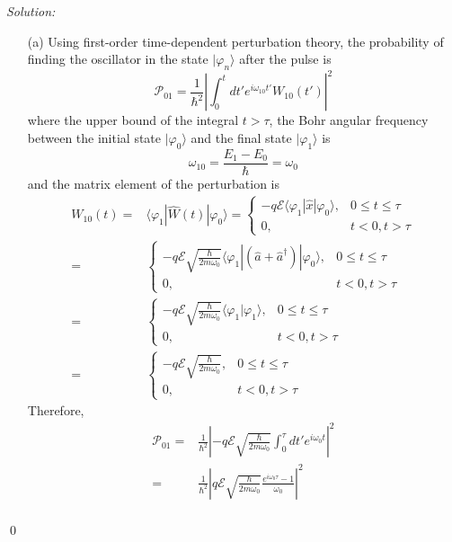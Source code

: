 \documentclass[10pt,a4paper]{article}
\newenvironment{sol}
    {\emph{Solution:}
    }
    {
    \qed
    }
\begin{document}
\begin{sol}
\begin{itemize}
\item[(a)] Using first-order time-dependent perturbation theory, the probability of finding the oscillator in the state $|\varphi_n\rangle$ after the pulse is
\begin{equation}
\mathscr{P}_{01}=\frac{1}{\hbar^2}\left|\int_0^{t}dt'e^{i\omega_{10}t'}W_{10}(t')\right|^2
\end{equation}
where the upper bound of the integral $t>\tau$, the Bohr angular frequency between the initial state $|\varphi_0\rangle$ and the final state $|\varphi_1\rangle$ is
\begin{equation}
\omega_{10}=\frac{E_1-E_0}{\hbar}=\omega_0
\end{equation}
and the matrix element of the perturbation is
\begin{align}
\nonumber W_{10}(t)=&\langle\varphi_1|\hat{W}(t)|\varphi_0\rangle=\left\{\begin{array}{ll}
-q\mathscr{E}\langle\varphi_1|\hat{x}|\varphi_0\rangle,&0\leq t\leq\tau\\
0,&t<0,t>\tau
\end{array}\right.\\
\nonumber=&\left\{\begin{array}{ll}
-q\mathscr{E}\sqrt{\frac{\hbar}{2m\omega_0}}\langle\varphi_1|(\hat{a}+\hat{a}^{\dagger})|\varphi_0\rangle,&0\leq t\leq\tau\\
0,&t<0,t>\tau
\end{array}\right.\\
\nonumber=&\left\{\begin{array}{ll}
-q\mathscr{E}\sqrt{\frac{\hbar}{2m\omega_0}}\langle\varphi_1|\varphi_1\rangle,&0\leq t\leq\tau\\
0,&t<0,t>\tau
\end{array}\right.\\
=&\left\{\begin{array}{ll}
-q\mathscr{E}\sqrt{\frac{\hbar}{2m\omega_0}},&0\leq t\leq\tau\\
0,&t<0,t>\tau
\end{array}\right.
\end{align}
Therefore,
\begin{align}
\nonumber\mathscr{P}_{01}=&\frac{1}{\hbar^2}\left|-q\mathscr{E}\sqrt{\frac{\hbar}{2m\omega_0}}\int_0^{\tau}dt'e^{i\omega_0t}\right|^2\\
\nonumber=&\frac{1}{\hbar^2}\left|q\mathscr{E}\sqrt{\frac{\hbar}{2m\omega_0}}\frac{e^{i\omega_0\tau}-1}{\omega_0}\right|^2\\

\end{align}
\end{itemize}
\end{sol}
\end{document}
